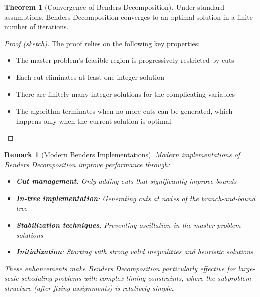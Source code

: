 \documentclass{article}
\newtheorem{remark}{Remark}
\theoremstyle{definition}
\newtheorem{theorem}{Theorem}
\begin{document}
\begin{theorem}[Convergence of Benders Decomposition]
Under standard assumptions, Benders Decomposition converges to an optimal solution in a finite number of iterations.

\begin{proof}[Proof (sketch)]
The proof relies on the following key properties:
\begin{itemize}
    \item The master problem's feasible region is progressively restricted by cuts
    \item Each cut eliminates at least one integer solution
    \item There are finitely many integer solutions for the complicating variables
    \item The algorithm terminates when no more cuts can be generated, which happens only when the current solution is optimal
\end{itemize}
\end{proof}
\end{theorem}

\begin{remark}[Modern Benders Implementations]
Modern implementations of Benders Decomposition improve performance through:
\begin{itemize}
    \item \textbf{Cut management}: Only adding cuts that significantly improve bounds
    \item \textbf{In-tree implementation}: Generating cuts at nodes of the branch-and-bound tree
    \item \textbf{Stabilization techniques}: Preventing oscillation in the master problem solutions
    \item \textbf{Initialization}: Starting with strong valid inequalities and heuristic solutions
\end{itemize}

These enhancements make Benders Decomposition particularly effective for large-scale scheduling problems with complex timing constraints, where the subproblem structure (after fixing assignments) is relatively simple.
\end{remark}
\end{document}
